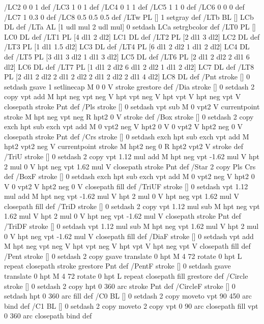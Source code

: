 /LC2 {0 0 1} def
/LC3 {1 0 1} def
/LC4 {0 1 1} def
/LC5 {1 1 0} def
/LC6 {0 0 0} def
/LC7 {1 0.3 0} def
/LC8 {0.5 0.5 0.5} def
/LTw {PL [] 1 setgray} def
/LTb {BL [] LCb DL} def
/LTa {AL [1 udl mul 2 udl mul] 0 setdash LCa setrgbcolor} def
/LT0 {PL [] LC0 DL} def
/LT1 {PL [4 dl1 2 dl2] LC1 DL} def
/LT2 {PL [2 dl1 3 dl2] LC2 DL} def
/LT3 {PL [1 dl1 1.5 dl2] LC3 DL} def
/LT4 {PL [6 dl1 2 dl2 1 dl1 2 dl2] LC4 DL} def
/LT5 {PL [3 dl1 3 dl2 1 dl1 3 dl2] LC5 DL} def
/LT6 {PL [2 dl1 2 dl2 2 dl1 6 dl2] LC6 DL} def
/LT7 {PL [1 dl1 2 dl2 6 dl1 2 dl2 1 dl1 2 dl2] LC7 DL} def
/LT8 {PL [2 dl1 2 dl2 2 dl1 2 dl2 2 dl1 2 dl2 2 dl1 4 dl2] LC8 DL} def
/Pnt {stroke [] 0 setdash gsave 1 setlinecap M 0 0 V stroke grestore} def
/Dia {stroke [] 0 setdash 2 copy vpt add M
  hpt neg vpt neg V hpt vpt neg V
  hpt vpt V hpt neg vpt V closepath stroke
  Pnt} def
/Pls {stroke [] 0 setdash vpt sub M 0 vpt2 V
  currentpoint stroke M
  hpt neg vpt neg R hpt2 0 V stroke
 } def
/Box {stroke [] 0 setdash 2 copy exch hpt sub exch vpt add M
  0 vpt2 neg V hpt2 0 V 0 vpt2 V
  hpt2 neg 0 V closepath stroke
  Pnt} def
/Crs {stroke [] 0 setdash exch hpt sub exch vpt add M
  hpt2 vpt2 neg V currentpoint stroke M
  hpt2 neg 0 R hpt2 vpt2 V stroke} def
/TriU {stroke [] 0 setdash 2 copy vpt 1.12 mul add M
  hpt neg vpt -1.62 mul V
  hpt 2 mul 0 V
  hpt neg vpt 1.62 mul V closepath stroke
  Pnt} def
/Star {2 copy Pls Crs} def
/BoxF {stroke [] 0 setdash exch hpt sub exch vpt add M
  0 vpt2 neg V hpt2 0 V 0 vpt2 V
  hpt2 neg 0 V closepath fill} def
/TriUF {stroke [] 0 setdash vpt 1.12 mul add M
  hpt neg vpt -1.62 mul V
  hpt 2 mul 0 V
  hpt neg vpt 1.62 mul V closepath fill} def
/TriD {stroke [] 0 setdash 2 copy vpt 1.12 mul sub M
  hpt neg vpt 1.62 mul V
  hpt 2 mul 0 V
  hpt neg vpt -1.62 mul V closepath stroke
  Pnt} def
/TriDF {stroke [] 0 setdash vpt 1.12 mul sub M
  hpt neg vpt 1.62 mul V
  hpt 2 mul 0 V
  hpt neg vpt -1.62 mul V closepath fill} def
/DiaF {stroke [] 0 setdash vpt add M
  hpt neg vpt neg V hpt vpt neg V
  hpt vpt V hpt neg vpt V closepath fill} def
/Pent {stroke [] 0 setdash 2 copy gsave
  translate 0 hpt M 4 {72 rotate 0 hpt L} repeat
  closepath stroke grestore Pnt} def
/PentF {stroke [] 0 setdash gsave
  translate 0 hpt M 4 {72 rotate 0 hpt L} repeat
  closepath fill grestore} def
/Circle {stroke [] 0 setdash 2 copy
  hpt 0 360 arc stroke Pnt} def
/CircleF {stroke [] 0 setdash hpt 0 360 arc fill} def
/C0 {BL [] 0 setdash 2 copy moveto vpt 90 450 arc} bind def
/C1 {BL [] 0 setdash 2 copy moveto
	2 copy vpt 0 90 arc closepath fill
	vpt 0 360 arc closepath} bind def
